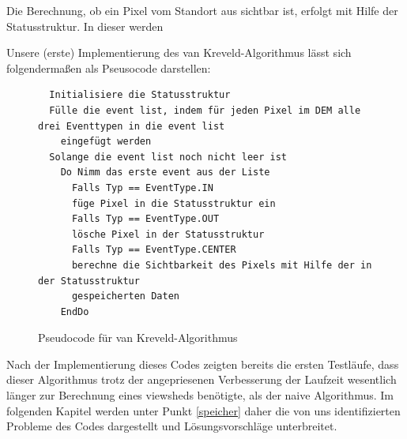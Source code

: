 Die Berechnung, ob ein Pixel vom Standort aus sichtbar ist, erfolgt mit Hilfe der Statusstruktur. In dieser werden 

Unsere (erste) Implementierung des van Kreveld-Algorithmus lässt sich folgendermaßen als Pseusocode darstellen:

\begin{figure}[!ht]
 \centering
 \begin{BVerbatim}
  Initialisiere die Statusstruktur 
  Fülle die event list, indem für jeden Pixel im DEM alle drei Eventtypen in die event list 
    eingefügt werden  
  Solange die event list noch nicht leer ist 
    Do Nimm das erste event aus der Liste 
      Falls Typ == EventType.IN
	  füge Pixel in die Statusstruktur ein
      Falls Typ == EventType.OUT
	  lösche Pixel in der Statusstruktur 
      Falls Typ == EventType.CENTER
	  berechne die Sichtbarkeit des Pixels mit Hilfe der in der Statusstruktur 
	  gespeicherten Daten
    EndDo

 \end{BVerbatim}
 \caption{Pseudocode für van Kreveld-Algorithmus}
 \label{pseudo_krev}
\end{figure}

Nach der Implementierung dieses Codes zeigten bereits die ersten Testläufe, dass dieser Algorithmus trotz der angepriesenen Verbesserung der Laufzeit 
wesentlich länger zur Berechnung eines viewsheds benötigte, als der naive Algorithmus. Im folgenden Kapitel werden unter Punkt \ref{speicher} daher 
die von uns identifizierten Probleme des Codes dargestellt und Lösungsvorschläge unterbreitet. 


